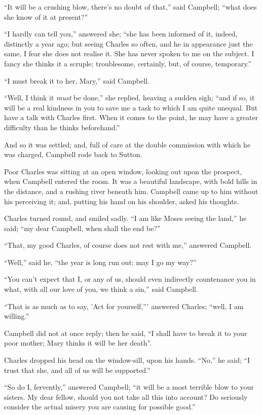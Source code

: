 ``It will be a crushing blow, there's no doubt of that,''
said Campbell; ``what does she know of it at present?''

``I hardly can tell you,'' answered she; ``she has been
informed of it, indeed, distinctly a year ago; but seeing Charles so
often, and he in appearance just the same, I fear she does not realise
it. She has never spoken to me on the subject. I fancy she thinks it a
scruple; troublesome, certainly, but, of course, temporary.''

``I must break it to her, Mary,'' said Campbell.

``Well, I think it \emph{must} be done,'' she replied,
heaving a sudden sigh; ``and if so, it will be a real kindness in
you to save me a task to which I am quite unequal. But have a talk
with Charles first. When it comes to the point, he may have a greater
difficulty than he thinks beforehand.''

And so it was settled; and, full of care at the double commission
with which he was charged, Campbell rode back to Sutton.

Poor Charles was sitting at an open window, looking out upon the
prospect, when Campbell entered the room. It was a beautiful
landscape, with bold hills in the distance, and a rushing river
beneath him. Campbell came up to him without his perceiving it; and,
putting his hand on his shoulder, asked his thoughts.

Charles turned round, and smiled sadly. ``I am like Moses
seeing the land,'' he said; ``my dear Campbell, when shall the
end be?''

``That, my good Charles, of course does not rest with me,''
answered Campbell.

``Well,'' said he, ``the year is long run out; may I go
my way?''

``You can't expect that I, or any of us, should even indirectly
countenance you in what, with all our love of you, we think a
sin,'' said Campbell.

``That is as much as to say, 'Act for yourself,''' answered
Charles; ``well, I am willing.''

Campbell did not at once reply; then he said, ``I shall have to
break it to your poor mother; Mary thinks it will be her death''.

Charles dropped his head on the window-sill, upon his hands.
``No,'' he said; ``I trust that she, and all of us will be
supported.''

``So do I, fervently,'' answered Campbell; ``it will be
a most terrible blow to your sisters. My dear fellow, should you not
take all this into account? Do seriously consider the actual misery
you are causing for possible good.''

